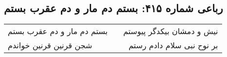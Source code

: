 \begin{center}
\section*{رباعی شماره ۴۱۵: بستم دم مار و دم عقرب بستم}
\label{sec:sh415}
\begin{longtable}{l p{0.5cm} r}
بستم دم مار و دم عقرب بستم
&&
نیش و دمشان بیکدگر پیوستم
\\
شجن قرنین قرنین خواندم
&&
بر نوح نبی سلام دادم رستم
\\
\end{longtable}
\end{center}

